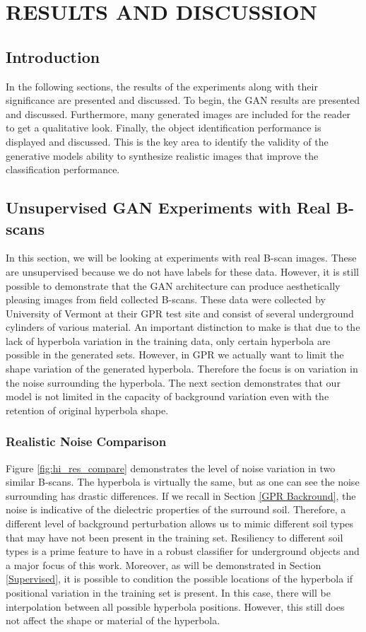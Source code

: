 \doublespacing
\chapter{RESULTS AND DISCUSSION}\label{results}


\section{Introduction}
In the following sections, the results of the experiments along with their significance are presented and discussed. To begin, the GAN results are presented and discussed. Furthermore, many generated images are included for the reader to get a qualitative look. Finally, the object identification performance is displayed and discussed. This is the key area to identify the validity of the generative models ability to synthesize realistic images that improve the classification performance.

\section{Unsupervised GAN Experiments with Real B-scans}\label{Unsupervised}
In this section, we will be looking at experiments with real B-scan images. These are unsupervised because we do not have labels for these data. However, it is still possible to demonstrate that the GAN architecture can produce aesthetically pleasing images from field collected B-scans. These data were collected by University of Vermont at their GPR test site and consist of several underground cylinders of various material. An important distinction to make is that due to the lack of hyperbola variation in the training data, only certain hyperbola are possible in the generated sets. However, in GPR we actually want to limit the shape variation of the generated hyperbola. Therefore the focus is on variation in the noise surrounding the hyperbola. The next section demonstrates that our model is not limited in the capacity of background variation even with the retention of original hyperbola shape.

\subsection{Realistic Noise Comparison}\label{background comparison}
Figure \ref{fig:hi_res_compare} demonstrates the level of noise variation in two similar B-scans. The hyperbola is virtually the same, but as one can see the noise surrounding has drastic differences. If we recall in Section \ref{GPR Backround}, the noise is indicative of the dielectric properties of the surround soil. Therefore, a different level of background perturbation allows us to mimic different soil types that may have not been present in the training set. Resiliency to different soil types is a prime feature to have in a robust classifier for underground objects and a major focus of this work.  Moreover, as will be demonstrated in Section \ref{Supervised}, it is possible to condition the possible locations of the hyperbola if positional variation in the training set is present. In this case, there will be interpolation between all possible hyperbola positions. However, this still does not affect the shape or material of the hyperbola.

